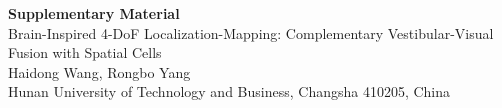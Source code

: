 \documentclass[11pt]{article}
\begin{document}
\begin{center}
{\Large\bfseries Supplementary Material}\\[8pt]
{\large Brain-Inspired 4-DoF Localization-Mapping: Complementary Vestibular-Visual Fusion with Spatial Cells}\\[8pt]
Haidong Wang, Rongbo Yang\\
Hunan University of Technology and Business, Changsha 410205, China
\end{center}

\vspace{1em}

\end{document}

